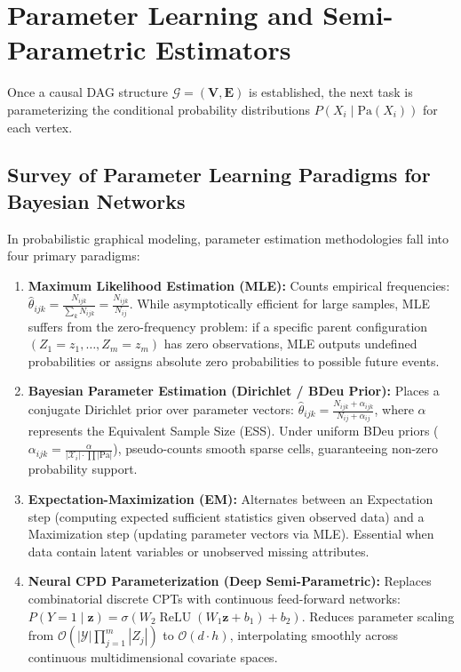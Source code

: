 \section{Parameter Learning and Semi-Parametric Estimators}
\label{sec:bg_estimators}

Once a causal DAG structure $\mathcal{G} = (\mathbf{V}, \mathbf{E})$ is established, the next task is parameterizing the conditional probability distributions $P(X_i \mid \text{Pa}(X_i))$ for each vertex.

\subsection{Survey of Parameter Learning Paradigms for Bayesian Networks}
In probabilistic graphical modeling, parameter estimation methodologies fall into four primary paradigms:
\begin{enumerate}
    \item \textbf{Maximum Likelihood Estimation (MLE):} Counts empirical frequencies: $\hat{\theta}_{ijk} = \frac{N_{ijk}}{\sum_k N_{ijk}} = \frac{N_{ijk}}{N_{ij}}$. While asymptotically efficient for large samples, MLE suffers from the zero-frequency problem: if a specific parent configuration $(Z_1=z_1, \dots, Z_m=z_m)$ has zero observations, MLE outputs undefined probabilities or assigns absolute zero probabilities to possible future events.
    \item \textbf{Bayesian Parameter Estimation (Dirichlet / BDeu Prior):} Places a conjugate Dirichlet prior over parameter vectors: $\hat{\theta}_{ijk} = \frac{N_{ijk} + \alpha_{ijk}}{N_{ij} + \alpha_{ij}}$, where $\alpha$ represents the Equivalent Sample Size (ESS). Under uniform BDeu priors ($\alpha_{ijk} = \frac{\alpha}{|\mathcal{X}_i| \cdot \prod |\text{Pa}|}$), pseudo-counts smooth sparse cells, guaranteeing non-zero probability support.
    \item \textbf{Expectation-Maximization (EM):} Alternates between an Expectation step (computing expected sufficient statistics given observed data) and a Maximization step (updating parameter vectors via MLE). Essential when data contain latent variables or unobserved missing attributes.
    \item \textbf{Neural CPD Parameterization (Deep Semi-Parametric):} Replaces combinatorial discrete CPTs with continuous feed-forward networks: $P(Y=1 \mid \mathbf{z}) = \sigma(W_2 \operatorname{ReLU}(W_1 \mathbf{z} + b_1) + b_2)$. Reduces parameter scaling from $\mathcal{O}(|\mathcal{Y}| \prod_{j=1}^m |Z_j|)$ to $\mathcal{O}(d \cdot h)$, interpolating smoothly across continuous multidimensional covariate spaces.
\end{enumerate}

